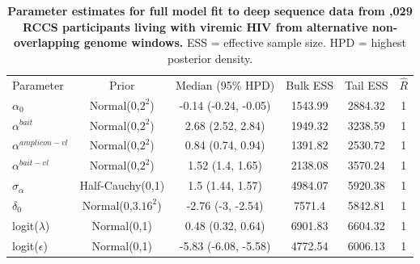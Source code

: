 \documentclass[10pt,letterpaper]{article}
\newlength\savedwidth
\newcommand\thickhline{\noalign{\global\savedwidth\arrayrulewidth\global\arrayrulewidth 2pt}%
\hline
\noalign{\global\arrayrulewidth\savedwidth}}
\begin{document}
\begin{table}[hbp!]
\centering
\begin{tabular}[t]{|l|c|c|c|c|c|}
\hline
Parameter  & Prior & Median (95\% HPD) & Bulk ESS & Tail ESS & $\hat{R}$ \\ \thickhline
$\alpha_0$ & Normal(0,$2^2$) &
  -0.14 
    (-0.24, -0.05) & 
  1543.99 & 
  2884.32 & 
  1 \\ \hline
  $\alpha^{bait}$ & Normal(0,$2^2$) &
  2.68
    (2.52, 2.84) & 
  1949.32 & 
  3238.59 & 
  1 \\ \hline
  $\alpha^{amplicon-vl}$ & Normal(0,$2^2$) &
  0.84
    (0.74, 0.94) & 
  1391.82 & 
  2530.72 & 
  1 \\ \hline
  $\alpha^{bait-vl}$ & Normal(0,$2^2$) &
  1.52
    (1.4, 1.65) & 
  2138.08 & 
  3570.24 & 
  1 \\ \hline
$\sigma_\alpha$ & Half-Cauchy(0,1) & 
  1.5
    (1.44, 1.57) & 
  4984.07 & 
  5920.38 &
  1 \\ \hline
$\delta_0$ & Normal(0,$3.16^2$) & 
  -2.76
    (-3, -2.54) & 
  7571.4 & 
  5842.81 & 
  1 \\ \hline
logit($\lambda$) & Normal(0,1) & 
  0.48
    (0.32, 0.64) & 
  6901.83 & 
  6604.32 & 
  1 \\ \hline
logit($\epsilon$) & Normal(0,1) & 
  -5.83
    (-6.08, -5.58) & 
  4772.54 & 
  6006.13 & 
  1 \\ \hline
\end{tabular}
\caption{{\bf Parameter estimates for full model fit to deep sequence data from ,029 RCCS participants living with viremic HIV from alternative non-overlapping genome windows.} ESS = effective sample size. HPD = highest posterior density. }
\label{empirical_full_alt_table}
\end{table}
\end{document}
